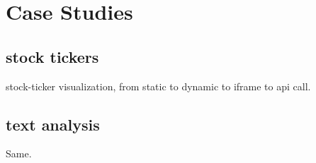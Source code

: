 \section{Case Studies}

\subsection{stock tickers}

stock-ticker visualization, from static to dynamic to iframe to api
call.

\subsection{text analysis}

Same.





%
